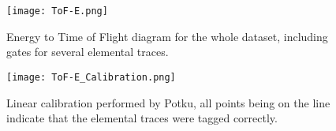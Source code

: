 \begin{figure}[ht]
    \centering
    \texttt{[image: ToF-E.png]}
    \caption{Energy to Time of Flight diagram for the whole dataset, including gates for several elemental traces.}
    \label{fig:tof}
\end{figure}

\begin{figure}[ht]
    \centering
    \texttt{[image: ToF-E\_Calibration.png]}
    \caption{Linear calibration performed by Potku, all points being on the line indicate that the elemental traces were tagged correctly.}
    \label{fig:calib}
\end{figure}